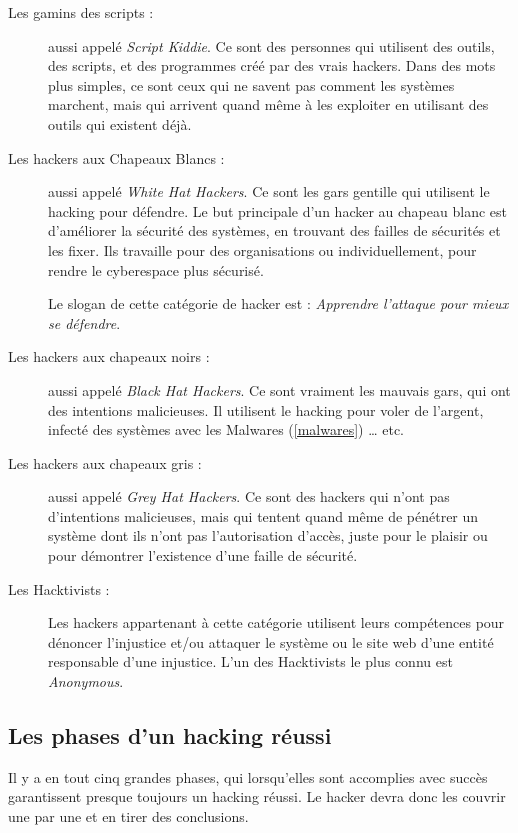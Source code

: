     \begin{description}
        \item[Les gamins des scripts :] aussi appelé \emph{Script Kiddie}. 
            Ce sont des personnes qui utilisent des outils, des scripts, et des programmes
            créé par des vrais hackers. Dans des mots plus simples, ce sont ceux qui ne savent pas comment 
            les systèmes marchent, mais qui arrivent quand même à les exploiter en utilisant des outils qui 
            existent déjà.

        \item[Les hackers aux Chapeaux Blancs :] aussi appelé \emph{White Hat Hackers}.
            Ce sont les gars gentille qui utilisent le hacking pour défendre. 
            Le but principale d'un hacker au chapeau blanc est d'améliorer la sécurité des systèmes, en trouvant
            des failles de sécurités et les fixer. Ils travaille pour des organisations ou individuellement, pour 
            rendre le cyberespace plus sécurisé.

            Le slogan de cette catégorie de hacker est : \emph{Apprendre l'attaque pour mieux se défendre}.
            
        \item[Les hackers aux chapeaux noirs :] aussi appelé \emph{Black Hat Hackers}.
            Ce sont vraiment les mauvais gars, qui ont des intentions malicieuses. Il utilisent le hacking 
            pour voler de l'argent, infecté des systèmes avec les Malwares (\autoref{malwares}) \ldots{} etc.

        \item[Les hackers aux chapeaux gris :] aussi appelé \emph{Grey Hat Hackers}.
            Ce sont des hackers qui n'ont pas d'intentions malicieuses, mais qui tentent quand même de pénétrer un système
            dont ils n'ont pas l'autorisation d'accès, juste pour le plaisir ou pour démontrer l’existence d'une faille de sécurité.

        \item[Les Hacktivists :] Les hackers appartenant à cette catégorie utilisent leurs compétences pour 
            dénoncer l'injustice et/ou attaquer le système ou le site web d'une entité responsable d'une injustice. 
            L'un des Hacktivists le plus connu est \emph{Anonymous}.
    \end{description}

    \subsection{Les phases d'un hacking réussi}
    Il y a en tout cinq grandes phases, qui lorsqu'elles sont accomplies avec succès garantissent presque 
    toujours un hacking \cite{bases_hacking} réussi. Le hacker devra donc les couvrir une 
    par une et en tirer des conclusions.

